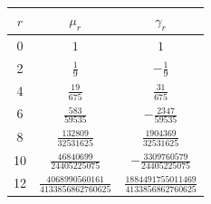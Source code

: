 \begin{tabular}{c|c|c}
$r$ & $\mu_r$ & $\gamma_r$ \\ \hline
0 & $1$ & $1$ \\
2 & $\frac{1}{9}$ & $- \frac{1}{9}$ \\
4 & $\frac{19}{675}$ & $\frac{31}{675}$ \\
6 & $\frac{583}{59535}$ & $- \frac{2347}{59535}$ \\
8 & $\frac{132809}{32531625}$ & $\frac{1904369}{32531625}$ \\
10 & $\frac{46840699}{24405225075}$ & $- \frac{3309760579}{24405225075}$ \\
12 & $\frac{4068990560161}{4133856862760625}$ & $\frac{1884491755011469}{4133856862760625}$ \\
\end{tabular}
